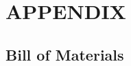 \documentclass[conference]{IEEEtran}
\begin{document}





\bibdata





\section*{APPENDIX}
    \subsection{Bill of Materials}
\end{document}
